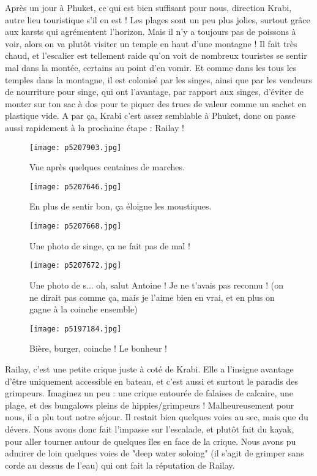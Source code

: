 \documentclass{book}
\begin{document}
Après un jour à Phuket, ce qui est bien suffisant pour nous, direction Krabi, autre lieu touristique s'il en est ! Les plages sont un peu plus jolies, surtout grâce aux karsts qui agrémentent l'horizon. Mais il n'y a toujours pas de poissons à voir, alors on va plutôt visiter un temple en haut d'une montagne ! Il fait très chaud, et l'escalier est tellement raide qu'on voit de nombreux touristes se sentir mal dans la montée, certains au point d'en vomir. Et comme dans les tous les temples dans la montagne, il est colonisé par les singes, ainsi que par les vendeurs de nourriture pour singe, qui ont l'avantage, par rapport aux singes, d'éviter de monter sur ton sac à dos pour te piquer des trucs de valeur comme un sachet en plastique vide. A par ça, Krabi c'est assez semblable à Phuket, donc on passe aussi rapidement à la prochaine étape : Railay !


\begin{figure}[h]
\centering
\texttt{[image: p5207903.jpg]}
\caption*{Vue après quelques centaines de marches.}
\end{figure}




\begin{figure}[h]
\centering
\texttt{[image: p5207646.jpg]}
\caption*{En plus de sentir bon, ça éloigne les moustiques.}
\end{figure}


\begin{figure}[h]
\centering
\texttt{[image: p5207668.jpg]}
\caption*{Une photo de singe, ça ne fait pas de mal !}
\end{figure}


\begin{figure}[h]
\centering
\texttt{[image: p5207672.jpg]}
\caption*{Une photo de s... oh, salut Antoine ! Je ne t'avais pas reconnu ! (on ne dirait pas comme ça, mais je l'aime bien en vrai, et en plus on gagne à la coinche ensemble)}
\end{figure}


\begin{figure}[h]
\centering
\texttt{[image: p5197184.jpg]}
\caption*{Bière, burger, coinche ! Le bonheur !}
\end{figure}

Railay, c'est une petite crique juste à coté de Krabi. Elle a l'insigne avantage d'être uniquement accessible en bateau, et c'est aussi et surtout le paradis des grimpeurs. Imaginez un peu : une crique entourée de falaises de calcaire, une plage, et des bungalows pleins de hippies/grimpeurs ! Malheureusement pour nous, il a plu tout notre séjour. Il restait bien quelques voies au sec, mais que du dévers. Nous avons donc fait l'impasse sur l'escalade, et plutôt fait du kayak, pour aller tourner autour de quelques îles en face de la crique. Nous avons pu admirer de loin quelques voies de "deep water soloing" (il s'agit de grimper sans corde au dessus de l'eau) qui ont fait la réputation de Railay.
\end{document}
